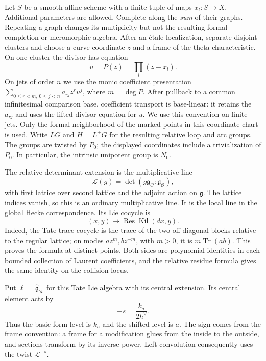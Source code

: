 \documentclass[11pt]{article}
\numberwithin{equation}{section}
\theoremstyle{definition}
\theoremstyle{remark}
\begin{document}
Let $S$ be a smooth affine scheme with a finite tuple of maps $x_l:S\to X$.
Additional parameters are allowed.  Complete along the \emph{sum} of their
graphs.  Repeating a graph changes its multiplicity but not the resulting
formal completion or meromorphic algebra.  After an \'etale localization,
separate disjoint clusters and choose a curve coordinate $z$ and a frame
of the theta characteristic.  On one cluster the divisor has equation
\[
                 u=P(z)=\prod_l(z-x_l).
\]
On jets of order $n$ we use the monic coefficient presentation
$\sum_{0\leq r<m,\,0\leq j<n}a_{rj}z^ru^j$, where $m=\deg P$.
After pullback to a common infinitesimal comparison base, coefficient
transport is base-linear: it retains the $a_{rj}$ and uses the lifted
divisor equation for $u$.  We use this convention on finite jets.
Only the formal neighborhood of the marked points in this coordinate
chart is used.  Write $LG$ and $H=L^+G$ for the resulting relative loop and
arc groups.  The groups are twisted by $P_0$; the displayed coordinates
include a trivialization of $P_0$.  In particular, the intrinsic unipotent
group is $N_0$.

The relative determinant extension is the multiplicative line
\[
     \mathcal L(g)=\det(g\mathfrak g_{\mathcal O}:\mathfrak g_{\mathcal O}),
\]
with first lattice over second lattice and the adjoint action on
$\mathfrak g$.  The lattice indices vanish, so this is an ordinary
multiplicative line.  It is the local line in the global Hecke
correspondence.  Its Lie cocycle is
\[
                       (x,y)\longmapsto
                       \operatorname{Res}\operatorname{Kil}(dx,y).
\]
Indeed, the Tate trace cocycle is the trace of the two off-diagonal
blocks relative to the regular lattice; on modes $az^m,bz^{-m}$, with
$m>0$, it is $m\operatorname{Tr}(ab)$.  This proves the formula at distinct
points.  Both sides are polynomial identities in each bounded collection
of Laurent coefficients, and the relative residue formula gives the same
identity on the collision locus.

Put $\ell=\widehat{\mathfrak g}_{\mathcal K}$ for this Tate Lie algebra
with its central extension.  Its central element acts by
\[
                         -s=\frac{k_a}{2h^\vee}.
\]
Thus the basic-form level is $k_a$ and the shifted level is $a$.  The
sign comes from the frame convention: a frame for a modification glues
from the inside to the outside, and sections transform by its inverse
power.  Left convolution consequently uses the twist $\mathcal L^{-s}$.
\end{document}
